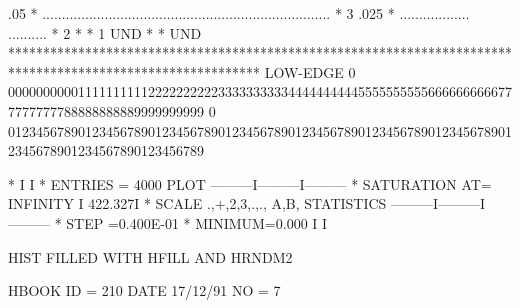 \begin{Listing}
      .05   *                   ..........................................................................             *   3
      .025  *                        ..................                          ..........                            *   2
            *                                                                                                          *   1
   UND      *                                                                                                          * UND
            ************************************************************************************************************
 LOW-EDGE   0   0000000000111111111122222222223333333333444444444455555555556666666666777777777788888888889999999999
            0   0123456789012345678901234567890123456789012345678901234567890123456789012345678901234567890123456789
 
  *                                                          I         I
  * ENTRIES =     4000                   PLOT       ---------I---------I---------
  * SATURATION  AT=     INFINITY                             I  422.327I
  * SCALE  .,+,2,3,.,., A,B,           STATISTICS   ---------I---------I---------
  * STEP =0.400E-01 * MINIMUM=0.000                          I         I
 
\newpage
 HIST FILLED WITH HFILL AND HRNDM2                                               
 
 HBOOK     ID =       210                                        DATE  17/12/91              NO =   7
 

\end{Listing}
